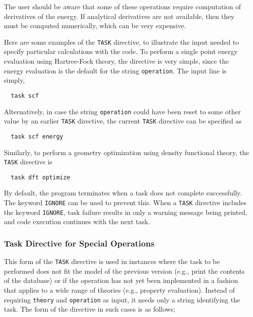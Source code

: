 \begin{itemize}
The user should be aware that some of these operations require
computation of derivatives of the energy.
If analytical derivatives are not available, then they must be
computed numerically, which can be very expensive.

Here are some examples of the \verb+TASK+ directive, to illustrate
the input needed to specify particular calculations with the code.  
To perform a single point energy evaluation using Hartree-Fock theory,
the directive is very simple, since the energy evaluation is the default
for the string \verb+operation+.  The input line is simply,

\begin{verbatim}
  task scf
\end{verbatim}

Alternatively, in case the string \verb+operation+ could have
been reset to some other value by an earlier \verb+TASK+ directive, the
current \verb+TASK+ directive can be specified as

\begin{verbatim}
  task scf energy
\end{verbatim}

Similarly, to perform a geometry optimization using density functional
theory, the \verb+TASK+ directive is

\begin{verbatim}
  task dft optimize
\end{verbatim}


By default, the program terminates when a task does not complete 
successfully.  The keyword \verb+IGNORE+ can be used to prevent this.
When a \verb+TASK+ directive includes the keyword \verb+IGNORE+, 
task failure results in only a warning message being printed, and 
code execution continues with the next task.

\subsubsection{Task Directive for Special Operations}

This form of the \verb+TASK+ directive is used in instances where 
the task to be performed does not fit the model of the previous 
version (e.g., print the contents of the
database) or if the operation has not yet been implemented in a
fashion that applies to a wide range of theories (e.g., property
evaluation).  Instead of requiring \verb+theory+ and \verb+operation+
as input, it needs only a string identifying the task.  The form of the
directive in such cases is as follows;


\end{itemize}
